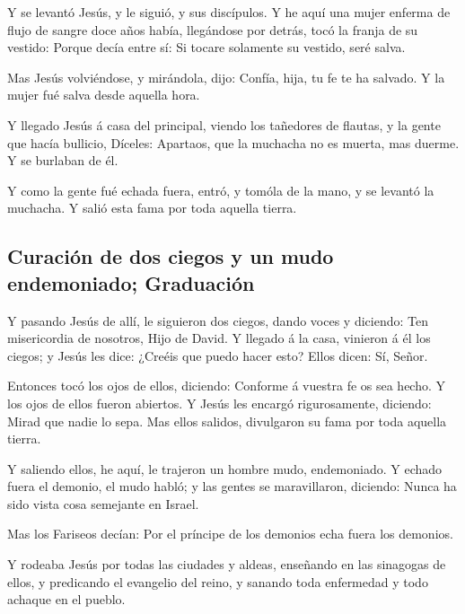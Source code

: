  Y se levantó Jesús, y le siguió, y sus discípulos.
 Y he aquí una mujer enferma de flujo de sangre doce años
había, llegándose por detrás, tocó la franja de su vestido:
 Porque decía entre sí: Si tocare solamente su vestido,
seré salva.

 Mas Jesús volviéndose, y mirándola, dijo: Confía, hija,
tu fe te ha salvado. Y la mujer fué salva desde aquella hora.

 Y llegado Jesús á casa del principal, viendo los
tañedores de flautas, y la gente que hacía bullicio, 
Díceles: Apartaos, que la muchacha no es muerta, mas duerme. Y se
burlaban de él.

 Y como la gente fué echada fuera, entró, y tomóla de la
mano, y se levantó la muchacha.  Y salió esta fama por
toda aquella tierra.

\hypertarget{curaciuxf3n-de-dos-ciegos-y-un-mudo-endemoniado-graduaciuxf3n}{%
\subsection{Curación de dos ciegos y un mudo endemoniado;
Graduación}\label{curaciuxf3n-de-dos-ciegos-y-un-mudo-endemoniado-graduaciuxf3n}}

 Y pasando Jesús de allí, le siguieron dos ciegos, dando
voces y diciendo: Ten misericordia de nosotros, Hijo de David.
 Y llegado á la casa, vinieron á él los ciegos; y Jesús
les dice: ¿Creéis que puedo hacer esto? Ellos dicen: Sí, Señor.

 Entonces tocó los ojos de ellos, diciendo: Conforme á
vuestra fe os sea hecho.  Y los ojos de ellos fueron
abiertos. Y Jesús les encargó rigurosamente, diciendo: Mirad que nadie
lo sepa.  Mas ellos salidos, divulgaron su fama por toda
aquella tierra.

 Y saliendo ellos, he aquí, le trajeron un hombre mudo,
endemoniado.  Y echado fuera el demonio, el mudo habló; y
las gentes se maravillaron, diciendo: Nunca ha sido vista cosa semejante
en Israel.

 Mas los Fariseos decían: Por el príncipe de los demonios
echa fuera los demonios.

 Y rodeaba Jesús por todas las ciudades y aldeas,
enseñando en las sinagogas de ellos, y predicando el evangelio del
reino, y sanando toda enfermedad y todo achaque en el pueblo.

